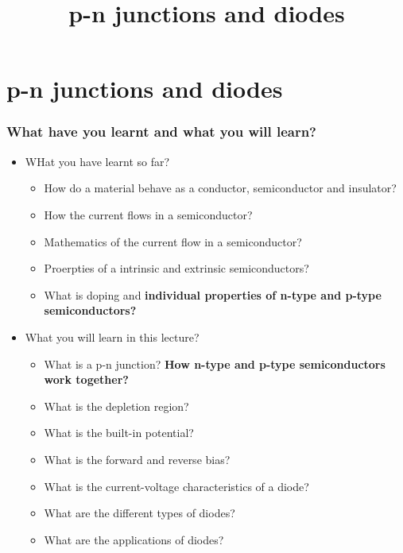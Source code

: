 \section{p-n junctions and diodes}
\title{p-n junctions and diodes}  

\begin{frame}[plain]
    \titlepage
\end{frame}

\begin{frame}
    \frametitle{What have you learnt and what you will learn?}

	\begin{itemize}
		\item WHat you have learnt so far? 
		\begin{itemize}
			\item How do a material behave as a conductor, semiconductor and insulator?
			\item How the current flows in a semiconductor?
			\item Mathematics of the current flow in a semiconductor?
			\item Proerpties of a intrinsic and extrinsic semiconductors?
			\item What is doping and \textbf{individual properties of n-type and p-type semiconductors?}
	\end{itemize}
		\item What you will learn in this lecture?
	\begin{itemize}
		\item What is a p-n junction? \textbf{How n-type and p-type semiconductors work together?}
		\item What is the depletion region?
		\item What is the built-in potential?
		\item What is the forward and reverse bias?
		\item What is the current-voltage characteristics of a diode?
		\item What are the different types of diodes?
		\item What are the applications of diodes?
	\end{itemize}
\end{itemize}
\end{frame}

